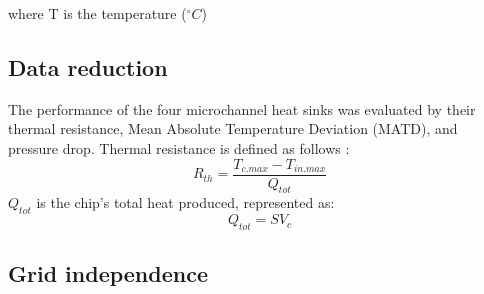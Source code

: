 where T is the temperature ($^{\circ}C$)


\subsection{Data reduction}


The performance of the four microchannel heat sinks was evaluated by their thermal resistance, Mean Absolute Temperature Deviation (MATD), and pressure drop.
Thermal resistance is defined as follows \cite{Ansari.Jeong_2021}:
\begin{equation}
    R_{th}=\frac{T_{c.max }-T_{in.max }}{Q_{tot}}
\end{equation}
$Q_{tot}$ is the chip's total heat produced, represented as:
\begin{equation}
    Q_{tot}=SV_{c}
\end{equation}

\subsection{Grid independence}